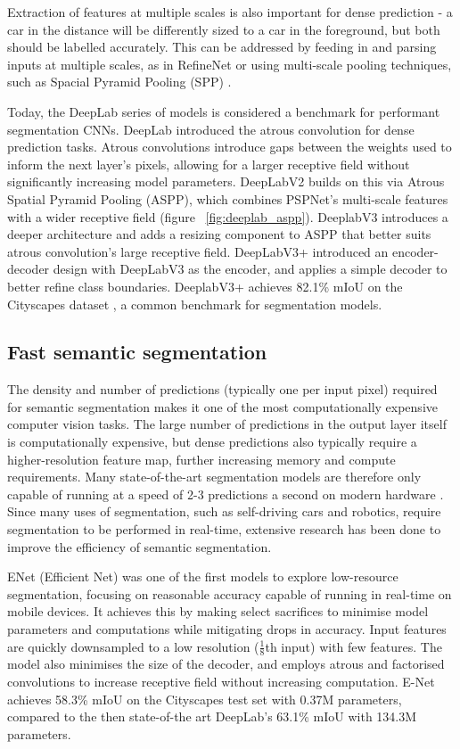 \documentclass[a4paper,12pt]{report}
\begin{document}
Extraction of features at multiple scales is also important for dense prediction - a car in the distance will be differently sized to a car in the foreground, but both should be labelled accurately. This can be addressed by feeding in and parsing inputs at multiple scales, as in RefineNet \cite{lin_refinenet_2016} or using multi-scale pooling techniques, such as Spacial Pyramid Pooling (SPP) \cite{he_spatial_2014}.

Today, the DeepLab series of models is considered a benchmark for performant segmentation CNNs. DeepLab \cite{chen_semantic_2016} introduced the atrous convolution for dense prediction tasks. Atrous convolutions introduce gaps between the weights used to inform the next layer’s pixels, allowing for a larger receptive field without significantly increasing model parameters. DeepLabV2 \cite{chen_deeplab_2017} builds on this via Atrous Spatial Pyramid Pooling (ASPP), which combines PSPNet’s \cite{zhao_pyramid_2017} multi-scale features with a wider receptive field (figure ~\ref{fig:deeplab_aspp}). DeeplabV3 \cite{chen_rethinking_2017} introduces a deeper architecture and adds a resizing component to ASPP that better suits atrous convolution’s large receptive field. DeepLabV3+ \cite{chen_encoder-decoder_2018} introduced an encoder-decoder design with DeepLabV3 as the encoder, and applies a simple decoder to better refine class boundaries. DeeplabV3+ achieves 82.1\% mIoU on the Cityscapes dataset \cite{cordts_cityscapes_2016}, a common benchmark for segmentation models.

\subsection{Fast semantic segmentation}
The density and number of predictions (typically one per input pixel) required for semantic segmentation makes it one of the most computationally expensive computer vision tasks. The large number of predictions in the output layer itself is computationally expensive, but dense predictions also typically require a higher-resolution feature map, further increasing memory and compute requirements. Many state-of-the-art segmentation models are therefore only capable of running at a speed of 2-3 predictions a second on modern hardware \cite{zhao_icnet_2018}. Since many uses of segmentation, such as self-driving cars and robotics, require segmentation to be performed in real-time, extensive research has been done to improve the efficiency of semantic segmentation.

ENet (Efficient Net) \cite{paszke_enet_2016} was one of the first models to explore low-resource segmentation, focusing on reasonable accuracy capable of running in real-time on mobile devices. It achieves this by making select sacrifices to minimise model parameters and computations while mitigating drops in accuracy. Input features are quickly downsampled to a low resolution ($\frac{1}{8}$th input) with few features. The model also minimises the size of the decoder, and employs atrous and factorised convolutions to increase receptive field without increasing computation. E-Net achieves 58.3\% mIoU on the Cityscapes test set with 0.37M parameters, compared to the then state-of-the art DeepLab’s 63.1\% mIoU with 134.3M parameters.
\end{document}
